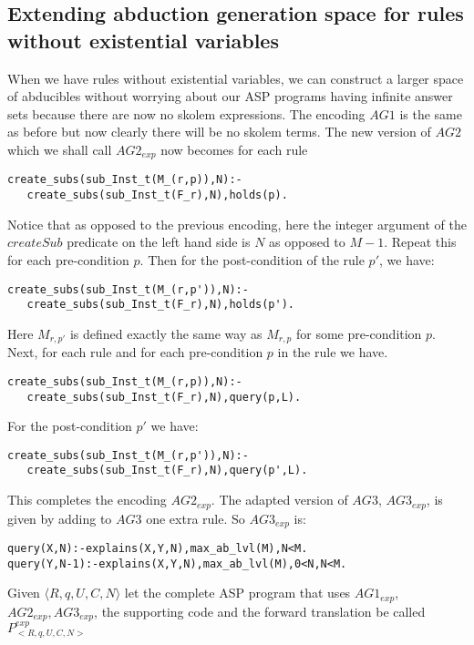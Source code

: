 \subsection{Extending abduction generation space for rules without existential variables}
When we have rules without existential variables, we can construct a larger
space of abducibles without worrying about our ASP programs having infinite
answer sets because there are now no skolem expressions. The encoding $AG1$ is
the same as before but now clearly there will be no skolem terms. The new
version of $AG2$ which we shall call $AG2_{exp}$ now becomes for each rule 
\begin{lstlisting}[frame=none]
create_subs(sub_Inst_t(M_(r,p)),N):-
   create_subs(sub_Inst_t(F_r),N),holds(p).   
\end{lstlisting}
Notice that as opposed to the previous encoding, here the integer argument of the $createSub$ predicate on the left hand side is $N$ as opposed to $M-1$. Repeat this for each pre-condition $p$. Then for the post-condition of the rule $p'$, we have:
\begin{lstlisting}[frame=none]
create_subs(sub_Inst_t(M_(r,p')),N):-
   create_subs(sub_Inst_t(F_r),N),holds(p').   
\end{lstlisting}
 
Here $M_{r,p'}$ is defined exactly the same way as $M_{r,p}$ for some pre-condition $p$. Next, for each rule and for each pre-condition $p$ in the rule we have.
\begin{lstlisting}[frame=none]
create_subs(sub_Inst_t(M_(r,p)),N):-
   create_subs(sub_Inst_t(F_r),N),query(p,L).   
\end{lstlisting}

For the post-condition $p'$ we have:
\begin{lstlisting}[frame=none]
create_subs(sub_Inst_t(M_(r,p')),N):-
   create_subs(sub_Inst_t(F_r),N),query(p',L).   
\end{lstlisting}

This completes the encoding $AG2_{exp}$. The adapted version of $AG3$,
$AG3_{exp}$, is given by adding to $AG3$ one extra rule. So $AG3_{exp}$ is: 
\begin{lstlisting}[frame=none]
query(X,N):-explains(X,Y,N),max_ab_lvl(M),N<M.
query(Y,N-1):-explains(X,Y,N),max_ab_lvl(M),0<N,N<M.
\end{lstlisting}
Given $\langle R,q,U,C,N \rangle$ let the complete ASP program that uses $AG1_{exp}$, $AG2_{exp}, AG3_{exp}$, the supporting code and the forward translation be called $P_{<R,q,U,C,N>}^{exp}$
